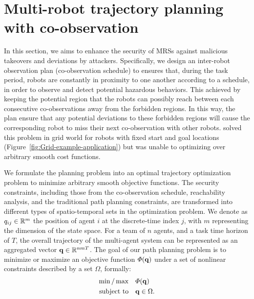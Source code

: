 \documentclass[journal]{IEEEtran}  %
\begin{document}
\section{Multi-robot trajectory planning with co-observation}

In this section, we aims to enhance the security of MRSs against malicious takeovers and deviations by attackers. Specifically, we design an inter-robot observation plan (co-observation schedule) to ensures that, during the task period, robots are constantly in proximity to one another according to a schedule, in order to observe and detect potential hazardous behaviors. This achieved by keeping the potential region that the robots can possibly reach between each consecutive co-observations away from the forbidden regions. In this way, the plan ensure that any potential deviations to these forbidden regions will cause the corresponding robot to miss their next co-observation with other robots. \cite{wardega2019resilience} solved this problem in grid world for robots with fixed start and goal locations (Figure~\ref{fig:Grid-example-application}) but was unable to optimizing over arbitrary smooth cost functions. 

We formulate the planning problem into an optimal trajectory optimization problem to minimize arbitrary smooth objective functions. The security constraints, including those from the co-observation schedule, reachability analysis, and the traditional path planning constraints, are transformed into different types of spatio-temporal sets in the optimization problem. We denote as $q_{ij}\in\mathbb{R}^{m}{}$ the position of agent $i$ at the discrete-time index $j$, with $m$ representing the dimension of the state space. For a team of $n$ agents, and a task time horizon of $T$, the overall trajectory of the multi-agent system can be represented as an aggregated vector $\mathbf{q}\in \mathbb{R}^{n m T}{}$. 
The goal of our path planning problem is to minimize or maximize an objective function $\varPhi(\mathbf{q})$ under a set of nonlinear constraints described by a set $\Omega$, formally:
\begin{equation}\label{eq:general-problem}
	\begin{split}
		\min/\max & \quad \varPhi(\mathbf{q})\\
		\textrm{subject to} &\quad \mathbf{q} \in \Omega.
	\end{split}
\end{equation}
\end{document}
